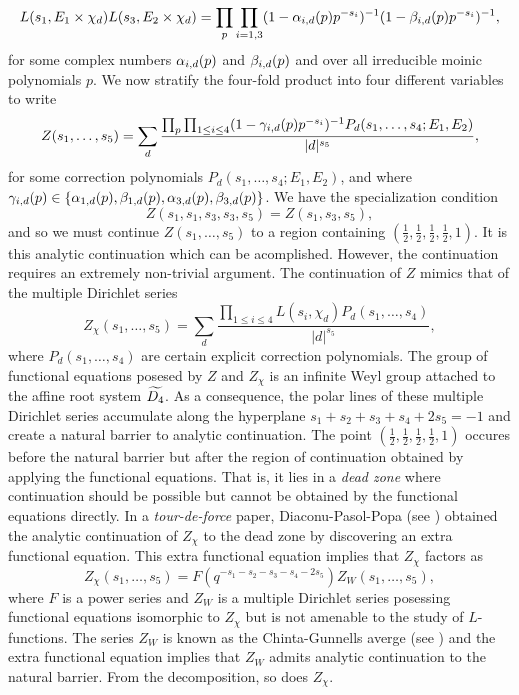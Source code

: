 \documentclass[12pt,reqno,oneside]{amsart}
\begin{document}
\[
  L(s_{1},E_{1} \times \chi_{d})L(s_{3},E_{2} \times \chi_{d}) = \prod_{p}\prod_{i = 1,3}(1-\alpha_{i,d}(p)p^{-s_{i}})^{-1}(1-\beta_{i,d}(p)p^{-s_{i}})^{-1},
\]
for some complex numbers $\alpha_{i,d}(p)$ and $\beta_{i,d}(p)$ and over all irreducible moinic polynomials $p$. We now stratify the four-fold product into four different variables to write
\[
  Z(s_{1},\ldots,s_{5}) = \sum_{d}\frac{\prod_{p}\prod_{1 \le i \le 4}(1-\gamma_{i,d}(p)p^{-s_{i}})^{-1}P_{d}(s_{1},\ldots,s_{4};E_{1},E_{2})}{|d|^{s_{5}}},
\]
for some correction polynomials $P_{d}(s_{1},\ldots,s_{4};E_{1},E_{2})$, and where $\gamma_{i,d}(p) \in \{\alpha_{1,d}(p),\beta_{1,d}(p),\alpha_{3,d}(p),\beta_{3,d}(p)\}$. We have the specialization condition
\begin{equation}\label{equ:specialization}
  Z(s_{1},s_{1},s_{3},s_{3},s_{5}) = Z(s_{1},s_{3},s_{5}), 
\end{equation}
and so we must continue $Z(s_{1},\ldots,s_{5})$ to a region containing $\left(\frac{1}{2},\frac{1}{2},\frac{1}{2},\frac{1}{2},1\right)$. It is this analytic continuation which can be acomplished. However, the continuation requires an extremely non-trivial argument. The continuation of $Z$ mimics that of the multiple Dirichlet series
\[
  Z_{\chi}(s_{1},\ldots,s_{5}) = \sum_{d}\frac{\prod_{1 \le i \le 4}L(s_{i},\chi_{d})P_{d}(s_{1},\ldots,s_{4})}{|d|^{s_{5}}},
\]
where $P_{d}(s_{1},\ldots,s_{4})$ are certain explicit correction polynomials. The group of functional equations posesed by $Z$ and $Z_{\chi}$ is an infinite Weyl group attached to the affine root system $\widetilde{D_{4}}$. As a consequence, the polar lines of these multiple Dirichlet series accumulate along the hyperplane $s_{1}+s_{2}+s_{3}+s_{4}+2s_{5} = -1$ and create a natural barrier to analytic continuation. The point $\left(\frac{1}{2},\frac{1}{2},\frac{1}{2},\frac{1}{2},1\right)$ occures before the natural barrier but after the region of continuation obtained by applying the functional equations. That is, it lies in a \textit{dead zone} where continuation should be possible but cannot be obtained by the functional equations directly. In a \textit{tour-de-force} paper, Diaconu-Pasol-Popa (see ) obtained the analytic continuation of $Z_{\chi}$ to the dead zone by discovering an extra functional equation. This extra functional equation implies that $Z_{\chi}$ factors as
\[
  Z_{\chi}(s_{1},\ldots,s_{5}) = F(q^{-s_{1}-s_{2}-s_{3}-s_{4}-2s_{5}})Z_{W}(s_{1},\ldots,s_{5}),
\]
where $F$ is a power series and $Z_{W}$ is a multiple Dirichlet series posessing functional equations isomorphic to $Z_{\chi}$ but is not amenable to the study of $L$-functions. The series $Z_{W}$ is known as the Chinta-Gunnells averge (see ) and the extra functional equation implies that $Z_{W}$ admits analytic continuation to the natural barrier. From the decomposition, so does $Z_{\chi}$.
\end{document}
